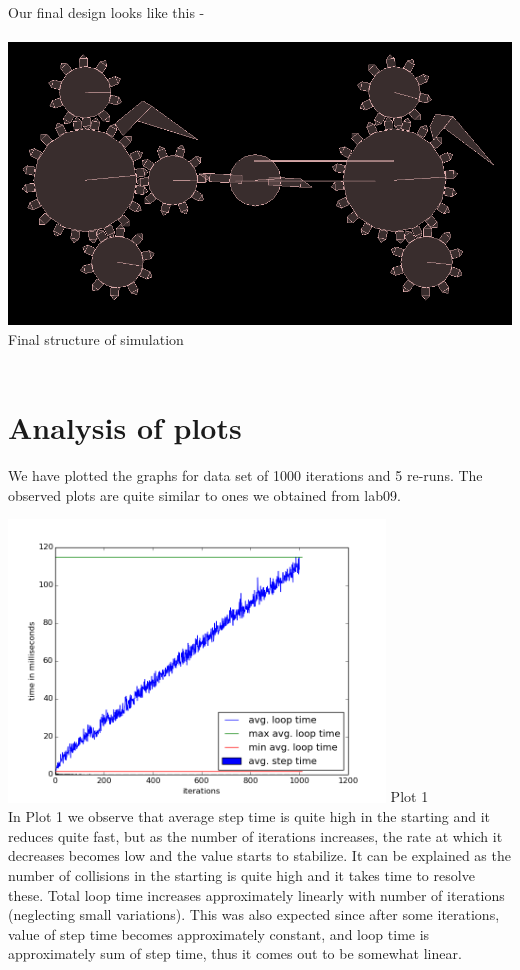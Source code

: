 \documentclass[11pt]{article}
\begin{document}
\\
\\
\\
\\
\\
\\
Our final design looks like this -
\\
\\
\includegraphics[scale=0.4]{../images/FinalDesign.png}
Final structure of simulation
\\
\\
\section{Analysis of plots}
We have plotted the graphs for data set of 1000 iterations and 5 re-runs.
The observed plots are quite similar to ones we obtained from lab09.

\includegraphics[width=\textwidth,height = 7.5cm]{../images/g08_plot01.png}
Plot 1
\\

In Plot 1 we observe that average step time is quite high in the starting
and it reduces quite fast, but as the number of iterations increases, the rate at which it decreases becomes low and the value starts to stabilize. 
It can be explained as the number of collisions in the starting is quite high and it takes time to resolve these. Total loop time increases approximately linearly with number of iterations (neglecting small variations). This was also expected since after some iterations, value of step time becomes approximately constant, and  loop time is approximately sum of step time, thus it comes out to be somewhat linear. 
\end{document}

